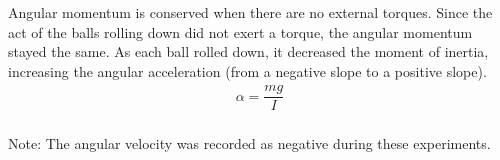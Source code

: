 \documentclass [12pt, letterpaper, twoside] {article}
\begin{document}
\noindent
Angular momentum is conserved when there are no external torques. Since the act of the balls rolling down did not exert a torque, the angular momentum stayed the same. As each ball rolled down, it decreased the moment of inertia, increasing the angular acceleration (from a negative slope to a positive slope).
\begin {equation*}
  \begin {split}
    \alpha = \dfrac{mg}{I} \\
  \end {split}
\end {equation*}

\noindent
Note: The angular velocity was recorded as negative during these experiments.
\end{document}
